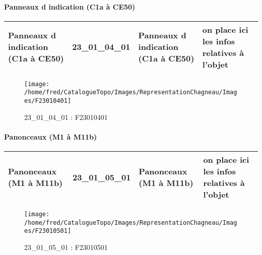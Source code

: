 \documentclass[12pt,titlepage,oneside]{book}
\begin{document}
\paragraph{Panneaux d indication (C1a à CE50)}
\noindent
\vspace{\baselineskip}

\renewcommand{\arraystretch}{1.2}
\begin{supertabular}{|p{10cm}|c|p{13cm}|p{12cm}|}
 Panneaux d indication (C1a à CE50) & 23\_01\_04\_01 & Panneaux d indication (C1a à CE50) & on place ici les infos relatives à l'objet\\
\hline
\end{supertabular}
\begin{figure}[h!]
  \hfill         %
  \begin{minipage}[t]{3cm}
    \begin{center}
      \texttt{[image: /home/fred/CatalogueTopo/Images/RepresentationChagneau/Images/F23010401]}
      \caption[F23010401]{\label{} 23\_01\_04\_01 : F23010401}
    \end{center}
  \end{minipage}
\end{figure}


\paragraph{Panonceaux (M1 à M11b)}
\noindent
\vspace{\baselineskip}

\renewcommand{\arraystretch}{1.2}
\begin{supertabular}{|p{10cm}|c|p{13cm}|p{12cm}|}
 Panonceaux (M1 à M11b) & 23\_01\_05\_01 & Panonceaux (M1 à M11b) & on place ici les infos relatives à l'objet\\
\hline
\end{supertabular}
\begin{figure}[h!]
  \hfill         %
  \begin{minipage}[t]{3cm}
    \begin{center}
      \texttt{[image: /home/fred/CatalogueTopo/Images/RepresentationChagneau/Images/F23010501]}
      \caption[F23010501]{\label{} 23\_01\_05\_01 : F23010501}
    \end{center}
  \end{minipage}
\end{figure}
\end{document}
